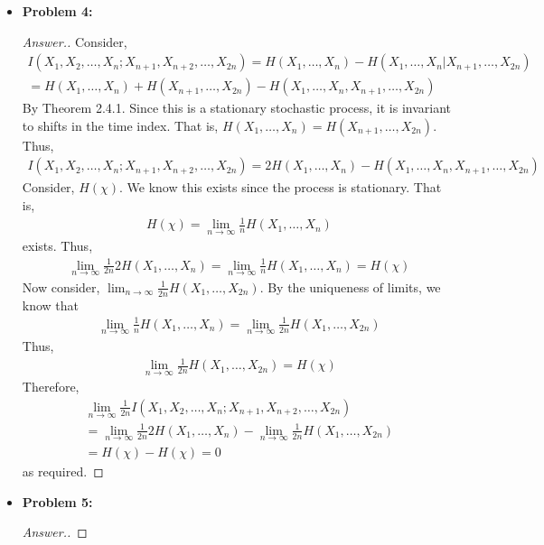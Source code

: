 \documentclass[10pt,twoside]{article}
\begin{document}
\begin{itemize}
    \item\textbf{Problem 4:} \newline
    \noindent\makebox[\linewidth]{\rule{18cm}{0.4pt}}
    \begin{proof}[Answer.]
    Consider, 
    \begin{gather*}
        I(X_1, X_2, \ldots, X_n; X_{n+1}, X_{n+2}, \ldots, X_{2n}) = H(X_1, \ldots, X_n) - H(X_1, \ldots, X_n|X_{n+1}, \ldots, X_{2n}) \\
        = H(X_1, \ldots, X_n) + H(X_{n+1}, \ldots, X_{2n}) - H(X_1, \ldots, X_n, X_{n+1}, \ldots,  X_{2n})
    \end{gather*}
    By Theorem 2.4.1. Since this is a stationary stochastic process, it is invariant to shifts in the time index. That is, $H(X_1, \ldots, X_n) = H(X_{n+1}, \ldots, X_{2n})$. Thus, 
    \begin{gather*}
        I(X_1, X_2, \ldots, X_n; X_{n+1}, X_{n+2}, \ldots, X_{2n}) = 2H(X_1, \ldots, X_n) - H(X_1, \ldots, X_n, X_{n+1}, \ldots,  X_{2n})
    \end{gather*}
    Consider, $H(\chi)$. We know this exists since the process is stationary. That is, 
    \begin{gather*}
        H(\chi) = \lim_{n\to \infty} \frac{1}{n}H(X_1, \ldots, X_n)
    \end{gather*}
    exists. Thus, 
    \begin{gather*}
        \lim_{n\to\infty} \frac{1}{2n}2H(X_1, \ldots, X_n) = \lim_{n\to \infty} \frac{1}{n}H(X_1, \ldots, X_n) =  H(\chi)
    \end{gather*}
    Now consider, $\lim_{n\to \infty}\frac{1}{2n}H(X_1, \ldots, X_{2n})$. By the uniqueness of limits, we know that 
    \begin{gather*}
        \lim_{n\to\infty}\frac{1}{n}H(X_1, \ldots, X_n) = \lim_{n\to\infty} \frac{1}{2n}H(X_1, \ldots, X_{2n})
    \end{gather*}
    Thus, \begin{gather*}
        \lim_{n\to\infty} \frac{1}{2n}H(X_1, \ldots, X_{2n}) = H(\chi)
    \end{gather*}
    Therefore, 
    \begin{gather*}
        \lim_{n\to\infty}\frac{1}{2n} I(X_1, X_2, \ldots, X_n; X_{n+1}, X_{n+2}, \ldots, X_{2n}) \\
        = \lim_{n\to\infty} \frac{1}{2n}2H(X_1, \ldots, X_n) - \lim_{n\to\infty}\frac{1}{2n}H(X_1, \ldots, X_{2n}) \\
        = H(\chi) - H(\chi) = 0
    \end{gather*}
    as required.
    
    \end{proof}
    
    \item\textbf{Problem 5:} \newline
    \noindent\makebox[\linewidth]{\rule{18cm}{0.4pt}}
    \begin{proof}[Answer.]
    
    \end{proof}
\end{itemize}

\label{LastPage}
\end{document}
